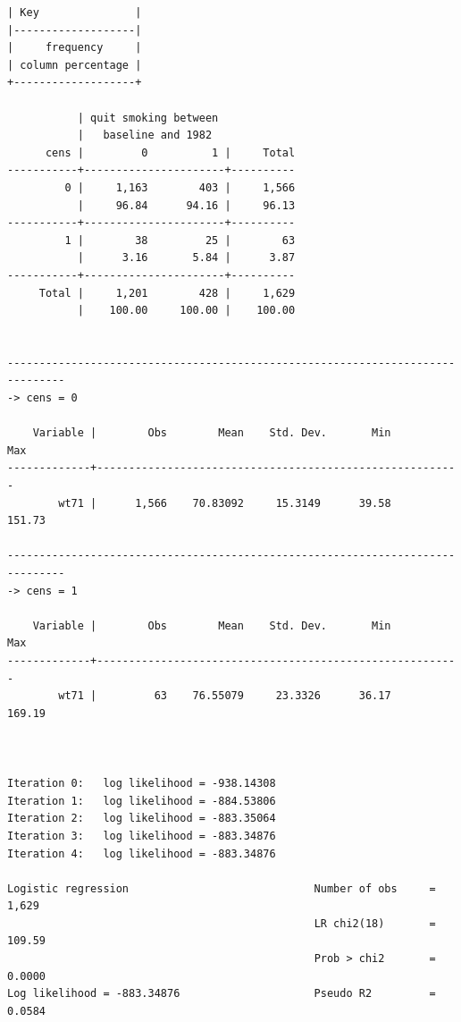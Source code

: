 \documentclass[
  10pt,
]{book}
\begin{document}
\begin{verbatim}
| Key               |
|-------------------|
|     frequency     |
| column percentage |
+-------------------+

           | quit smoking between
           |   baseline and 1982
      cens |         0          1 |     Total
-----------+----------------------+----------
         0 |     1,163        403 |     1,566 
           |     96.84      94.16 |     96.13 
-----------+----------------------+----------
         1 |        38         25 |        63 
           |      3.16       5.84 |      3.87 
-----------+----------------------+----------
     Total |     1,201        428 |     1,629 
           |    100.00     100.00 |    100.00 


-------------------------------------------------------------------------------
-> cens = 0

    Variable |        Obs        Mean    Std. Dev.       Min        Max
-------------+---------------------------------------------------------
        wt71 |      1,566    70.83092     15.3149      39.58     151.73

-------------------------------------------------------------------------------
-> cens = 1

    Variable |        Obs        Mean    Std. Dev.       Min        Max
-------------+---------------------------------------------------------
        wt71 |         63    76.55079     23.3326      36.17     169.19



Iteration 0:   log likelihood = -938.14308  
Iteration 1:   log likelihood = -884.53806  
Iteration 2:   log likelihood = -883.35064  
Iteration 3:   log likelihood = -883.34876  
Iteration 4:   log likelihood = -883.34876  

Logistic regression                             Number of obs     =      1,629
                                                LR chi2(18)       =     109.59
                                                Prob > chi2       =     0.0000
Log likelihood = -883.34876                     Pseudo R2         =     0.0584


\end{verbatim}
\end{document}
